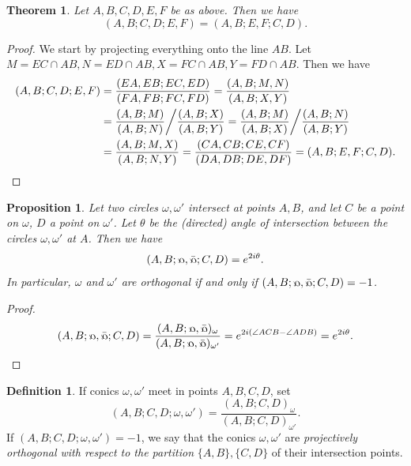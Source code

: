 \documentclass[letterpaper,11pt]{article}
\newtheorem{thm}{Theorem}
\newtheorem{prop}{Proposition}
\theoremstyle{definition}
\newtheorem{defn}{Definition}
\theoremstyle{remark}
\begin{document}
\begin{thm} Let $A,B,C,D,E,F$ be as above. Then we have
\[
(A,B;C,D;E,F) = (A,B;E,F;C,D).
\]
\end{thm}
\begin{proof} We start by projecting everything onto the line $AB$. Let $M = EC\cap AB, N = ED\cap AB, X = FC\cap AB, Y = FD\cap AB$. Then we have
\begin{align*}
(A,B;C,D;E,F) &= \frac{(EA,EB;EC,ED)}{(FA,FB;FC,FD)} = \frac{(A,B;M,N)}{(A,B;X,Y)}\\
&= \frac{(A,B;M)}{(A,B;N)}\bigg/\frac{(A,B;X)}{(A,B;Y)} = \frac{(A,B;M)}{(A,B;X)}\bigg/\frac{(A,B;N)}{(A,B;Y)}\\
&= \frac{(A,B;M,X)}{(A,B;N,Y)} = \frac{(CA,CB;CE,CF)}{(DA,DB;DE,DF)} = (A,B;E,F;C,D).\qedhere
\end{align*}
\end{proof}

\begin{prop} Let two circles $\omega, \omega'$ intersect at points $A,B$, and let $C$ be a point on $\omega$, $D$ a point on $\omega'$. Let $\theta$ be the (directed) angle of intersection between the circles $\omega, \omega'$ at $A$. Then we have
\[
(A,B;\fish,\bar\fish;C,D) = e^{2i\theta}.
\]
In particular, $\omega$ and $\omega'$ are orthogonal if and only if $(A,B;\fish,\bar\fish;C,D) = -1$.
\end{prop}
\begin{proof}
\[
(A,B;\fish,\bar\fish;C,D) = \frac{(A,B;\fish,\bar\fish)_\omega}{(A,B;\fish,\bar\fish)_{\omega'}} = e^{2i(\angle ACB - \angle ADB)} = e^{2i\theta}.\qedhere
\]
\end{proof}

\begin{defn} If conics $\omega,\omega'$ meet in points $A,B,C,D$, set
\[
(A,B;C,D;\omega,\omega') = \frac{(A,B;C,D)_\omega}{(A,B;C,D)_{\omega'}}.
\]
If $(A,B;C,D;\omega,\omega') = -1$, we say that the conics $\omega, \omega'$ are \emph{projectively orthogonal with respect to the partition} $\{A,B\},\{C,D\}$ of their intersection points.
\end{defn}
\end{document}
